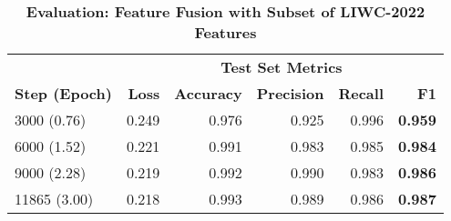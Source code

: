\begin{table}[H]
\centering
\caption[Evaluation: Feature Fusion with LIWC-2022 Subset]{\textbf{Evaluation: Feature Fusion with Subset of LIWC-2022 Features}}
\small
\label{tab:fusion_subset}
\begin{tabular}{@{}lrrrrr@{}} %
\toprule
& \multicolumn{5}{c}{\textbf{Test Set Metrics}} \\
\cmidrule(lr){2-6}
\textbf{Step (Epoch)} & \textbf{Loss} & \textbf{Accuracy} & \textbf{Precision} & \textbf{Recall} & \textbf{F1} \\
\midrule
3000 (0.76)  & 0.249 & 0.976 & 0.925 & 0.996 & \textbf{0.959} \\
6000 (1.52)  & 0.221 & 0.991 & 0.983 & 0.985 & \textbf{0.984} \\
9000 (2.28)  & 0.219 & 0.992 & 0.990 & 0.983 & \textbf{0.986} \\
11865 (3.00) & 0.218 & 0.993 & 0.989 & 0.986 & \textbf{0.987} \\
\bottomrule
\end{tabular}
\end{table}
